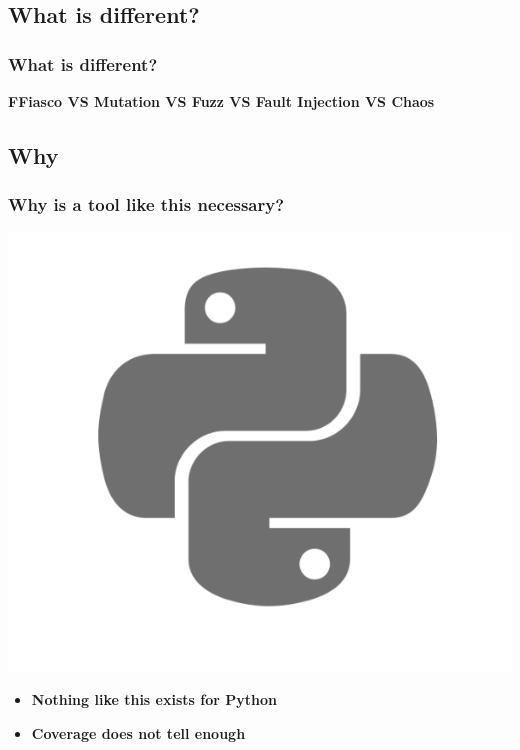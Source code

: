 \subsection{What is different?}
\begin{frame}
  \frametitle{What is different?}
  \begin{center}
    \small{\textbf{FFiasco VS Mutation VS Fuzz VS Fault Injection VS Chaos}}
  \end{center}
\end{frame}

\subsection{Why}
\begin{frame}
  \frametitle{Why is a tool like this necessary?}
    \begin{center}
      \includegraphics[scale = .15]{images/python}

      \begin{itemize}
        \item \textbf{Nothing like this exists for Python}
        \item \textbf{Coverage does not tell enough}
      \end{itemize}
    \end{center}
\end{frame}

